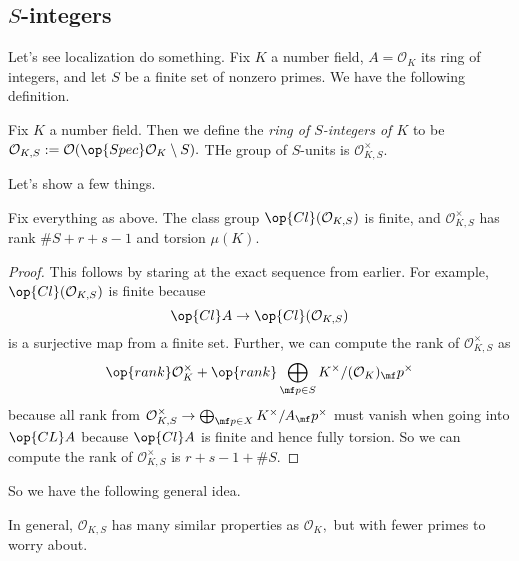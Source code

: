 \subsection{\texorpdfstring{$S$}{}-integers}
Let's see localization do something. Fix $K$ a number field, $A=\mathcal O_K$ its ring of integers, and let $S$ be a finite set of nonzero primes. We have the following definition.
\begin{definition}
    Fix $K$ a number field. Then we define the \textit{ring of $S$-integers of $K$} to be $\mathcal O_{K,S}:=\mathcal O(\op{Spec}\mathcal O_K\setminus S).$ THe group of $S$-units is $\mathcal O_{K,S}^\times.$
\end{definition}
Let's show a few things.
\begin{proposition}
    Fix everything as above. The class group $\op{Cl}(\mathcal O_{K,S})$ is finite, and $\mathcal O_{K,S}^\times$ has rank $\#S+r+s-1$ and torsion $\mu(K).$
\end{proposition}
\begin{proof}
    This follows by staring at the exact sequence from earlier. For example, $\op{Cl}(\mathcal O_{K,S})$ is finite because
    \[\op{Cl}A\to\op{Cl}(\mathcal O_{K,S})\]
    is a surjective map from a finite set. Further, we can compute the rank of $\mathcal O_{K,S}^\times$ as
    \[\op{rank}\mathcal O_K^\times+\op{rank}\bigoplus_{\mf p\in S}K^\times/(\mathcal O_K)_\mf p^\times\]
    because all rank from $\mathcal O_{K,S}^\times\to\bigoplus_{\mf p\in X}K^\times/A_\mf p^\times$ must vanish when going into $\op{CL}A$ because $\op{Cl}A$ is finite and hence fully torsion. So we can compute the rank of $\mathcal O_{K,S}^\times$ is $r+s-1+\#S.$
\end{proof}
So we have the following general idea.
\begin{idea}
    In general, $\mathcal O_{K,S}$ has many similar properties as $\mathcal O_K,$ but with fewer primes to worry about.
\end{idea}

